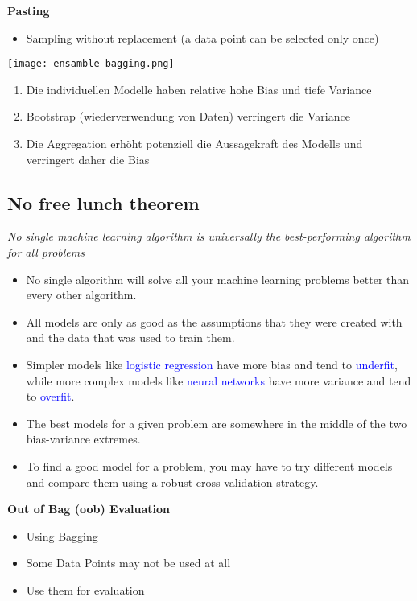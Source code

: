 \textbf{Pasting}
\begin{itemize}
    \item Sampling without replacement (a data point can be selected only once)
\end{itemize}
\vspace{10pt}
\texttt{[image: ensamble-bagging.png]}

\begin{enumerate}
    \item Die individuellen Modelle haben relative hohe Bias und tiefe Variance
    \item Bootstrap (wiederverwendung von Daten) verringert die Variance
    \item Die Aggregation erhöht potenziell die Aussagekraft des Modells und verringert daher die Bias
\end{enumerate}

\subsection{No free lunch theorem}
\textit{No single machine learning algorithm is universally the best-performing algorithm for all problems}

\begin{itemize}
    \item No single algorithm will solve all your machine learning problems better than every other algorithm.
    \item All models are only as good as the assumptions that they were created with and the data that was used to train them.
    \item Simpler models like \textcolor{blue}{logistic regression} have more bias and tend to \textcolor{blue}{underfit}, while more complex models like \textcolor{blue}{neural networks} have more variance and tend to \textcolor{blue}{overfit}.
    \item The best models for a given problem are somewhere in the middle of the two bias-variance extremes.
    \item To find a good model for a problem, you may have to try different models and compare them using a robust cross-validation strategy.
\end{itemize}
\vspace{10pt}
\textbf{Out of Bag (oob) Evaluation}
\begin{itemize}
    \item Using Bagging
    \item Some Data Points may not be used at all
    \item Use them for evaluation
\end{itemize}
